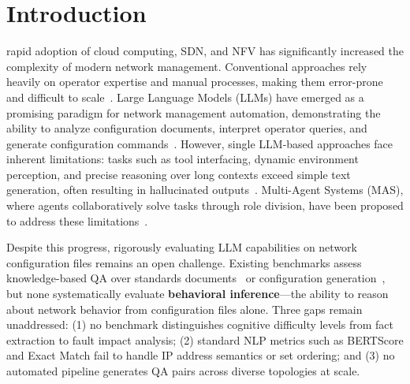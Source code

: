 % 
\section{Introduction}
 rapid adoption of cloud computing, SDN, and NFV has significantly increased the complexity of modern network management.
Conventional approaches rely heavily on operator expertise and manual processes, making them error-prone and difficult to scale~\cite{mao2017neural, meng2020interpreting}.
Large Language Models (LLMs) have emerged as a promising paradigm for network management automation, demonstrating the ability to analyze configuration documents, interpret operator queries, and generate configuration commands~\cite{liu2025large, wu2024netllm}.
However, single LLM-based approaches face inherent limitations: tasks such as tool interfacing, dynamic environment perception, and precise reasoning over long contexts exceed simple text generation, often resulting in hallucinated outputs~\cite{bekri2025bridging, wang2024netconfeval}.
Multi-Agent Systems (MAS), where agents collaboratively solve tasks through role division, have been proposed to address these limitations~\cite{ref2, arzo2021multiagent, bimo2025intentbased}.


Despite this progress, rigorously evaluating LLM capabilities on network configuration files remains an open challenge.
Existing benchmarks assess knowledge-based QA over standards documents~\cite{ref9, ref10} or configuration generation~\cite{wang2024netconfeval}, but none systematically evaluate \textbf{behavioral inference}---the ability to reason about network behavior from configuration files alone.
Three gaps remain unaddressed: (1) no benchmark distinguishes cognitive difficulty levels from fact extraction to fault impact analysis; (2) standard NLP metrics such as BERTScore and Exact Match fail to handle IP address semantics or set ordering; and (3) no automated pipeline generates QA pairs across diverse topologies at scale.


